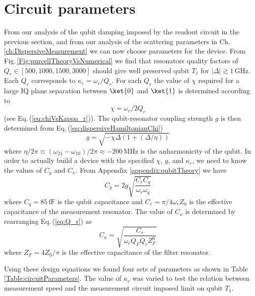 \section{Circuit parameters}

From our analysis of the qubit damping imposed by the readout circuit in the previous section, and from our analysis of the scattering parameters in Ch.\,\ref{ch:DispersiveMeasurement} we can now choose parameters for the device.
From Fig.\,\ref{Fig:purcellTheoryVsNumerical} we find that resonators quality factors of $Q_r \in [500, 1000, 1500, 3000]$ should give well preserved qubit $T_1$ for $\left| \Delta \right| \gtrsim 1\,\text{GHz}$.
Each $Q_r$ corresponds to $\kappa_r = \omega_r / Q_r$.
For each $Q_r$ the value of $\chi$ required for a large IQ plane separation between $\ket{0}$ and $\ket{1}$ is determined according to \begin{equation}
\chi = \omega_r / 2Q_r \end{equation}
(see Eq.\,(\ref{eq:chiVsKappa_r})).
The qubit-resonator coupling strength $g$ is then determined from Eq.\,(\ref{eq:dispersiveHamiltonianChi}) \begin{equation}
g = \sqrt{- \chi \Delta \left(1 + \left(\Delta/\eta \right) \right)} \end{equation}
where $\eta/2\pi \equiv \left( \omega_{21} - \omega_{10} \right) / 2 \pi \approx -200\,\text{MHz}$ is the anharmonicity of the qubit.
In order to actually build a device with the specified $\chi$, $g$, and $\kappa_r$, we need to know the values of $C_g$ and $C_{\kappa}$.
From Appendix \ref{appendix:qubitTheory} we have \begin{equation}
C_g = 2 g \sqrt{\frac{C_r C_q}{\omega_r \omega_q}} \label{eq:C_gVsg} \end{equation} 
where $C_q=85\,\text{fF}$ is the qubit capacitance and $C_r = \pi / 4 \omega_r Z_0$ is the effective capacitance of the measurement resonator.
The value of $C_{\kappa}$ is determined by rearranging Eq.\,(\ref{eq:Q_r}) as \begin{equation}
C_{\kappa} = \sqrt{\frac{C_r}{\omega_r Q_F Q_r Z_F^0}} \end{equation}
where $Z_F = 4Z_0/\pi$ is the effective capacitance of the filter resonator.

Using these design equations we found four sets of parameters as shown in Table\,\ref{Table:circuitParameters}.
The value of $\kappa_r$ was varied to test the relation between measurement speed and the measurement circuit imposed limit on qubit $T_1$.

